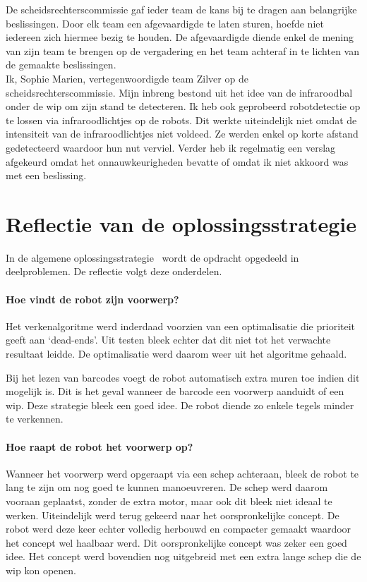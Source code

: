 \documentclass[eind]{penoverslag}
\begin{document}
De scheidsrechterscommissie gaf ieder team de kans bij te dragen aan belangrijke beslissingen. Door elk team een afgevaardigde te laten sturen, hoefde niet iedereen zich hiermee bezig te houden. De afgevaardigde diende enkel de mening van zijn team te brengen op de vergadering en het team achteraf in te lichten van de gemaakte beslissingen.\\

Ik, Sophie Marien, vertegenwoordigde team Zilver op de scheidsrechterscommissie. Mijn inbreng bestond uit het idee van de infraroodbal onder de wip om zijn stand te detecteren. Ik heb ook geprobeerd robotdetectie op te lossen via infraroodlichtjes op de robots. Dit werkte uiteindelijk niet omdat de intensiteit van de infraroodlichtjes niet voldeed. Ze werden enkel op korte afstand gedetecteerd waardoor hun nut verviel.
Verder heb ik regelmatig een verslag afgekeurd omdat het onnauwkeurigheden bevatte of omdat ik niet akkoord was met een beslissing.

\section{Reflectie van de oplossingsstrategie}
\label{Asec:strategie}
In de algemene oplossingsstrategie~\cite{Strategie} wordt de opdracht opgedeeld in deelproblemen. De reflectie volgt deze onderdelen.

\paragraph{Hoe vindt de robot zijn voorwerp?}
Het verkenalgoritme werd inderdaad voorzien van een optimalisatie die prioriteit geeft aan `dead-ends'. Uit testen bleek echter dat dit niet tot het verwachte resultaat leidde. De optimalisatie werd daarom weer uit het algoritme gehaald.

Bij het lezen van barcodes voegt de robot automatisch extra muren toe indien dit mogelijk is. Dit is het geval wanneer de barcode een voorwerp aanduidt of een wip. Deze strategie bleek een goed idee. De robot diende zo enkele tegels minder te verkennen.

\paragraph{Hoe raapt de robot het voorwerp op?}
Wanneer het voorwerp werd opgeraapt via een schep achteraan, bleek de robot te lang te zijn om nog goed te kunnen manoeuvreren. De schep werd daarom vooraan geplaatst, zonder de extra motor, maar ook dit bleek niet ideaal te werken. Uiteindelijk werd terug gekeerd naar het oorspronkelijke concept. De robot werd deze keer echter volledig herbouwd en compacter gemaakt waardoor het concept wel haalbaar werd. Dit oorspronkelijke concept was zeker een goed idee. Het concept werd bovendien nog uitgebreid met een extra lange schep die de wip kon openen.
\end{document}
